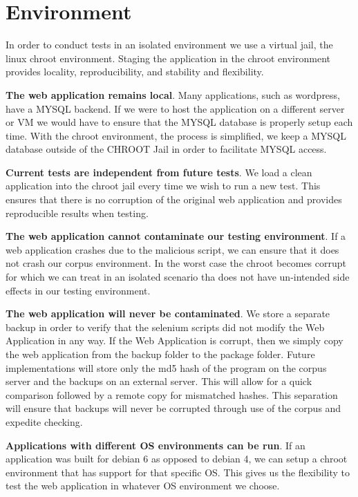 \documentclass[letterpaper,twocolumn,10pt]{article}
\begin{document}
\section{Environment}

In order to conduct tests in an isolated environment we use a virtual jail, the linux chroot environment.  Staging the application in the chroot environment provides locality, reproducibility, and stability and flexibility.

{\bf The web application remains local}.  Many applications, such as wordpress, have a MYSQL backend.  If we were to host the application on a different server or VM we would have to ensure that the MYSQL database is properly setup each time.  With the chroot environment, the process is simplified, we keep a MYSQL database outside of the CHROOT Jail in order to facilitate MYSQL access.  

{\bf Current tests are independent from future tests}.  We load a clean application into the chroot jail every time we wish to run a new test.  This ensures that there is no corruption of the original web application and provides reproducible results when testing.

{\bf The web application cannot contaminate our testing environment}.  If a web application crashes due to the malicious script, we can ensure that it does not crash our corpus environment.  In the worst case the chroot becomes corrupt for which we can treat in an isolated scenario tha does not have un-intended side effects in our testing environment.  

{\bf The web application will never be contaminated}.  We store a separate backup in order to verify that the selenium scripts did not modify the Web Application in any way.  If the Web Application is corrupt, then we simply copy the web application from the backup folder to the package folder.  Future implementations will store only the md5 hash of the program on the corpus server and the backups on an external server.  This will allow for a quick comparison followed by a remote copy for mismatched hashes.  This separation will ensure that backups will never be corrupted through use of the corpus and expedite checking.  

{\bf Applications with different OS environments can be run}.  If an application was built for debian 6 as opposed to debian 4, we can setup a chroot environment that has support for that specific OS.  This gives us the flexibility to test the web application in whatever OS environment we choose.
\end{document}
